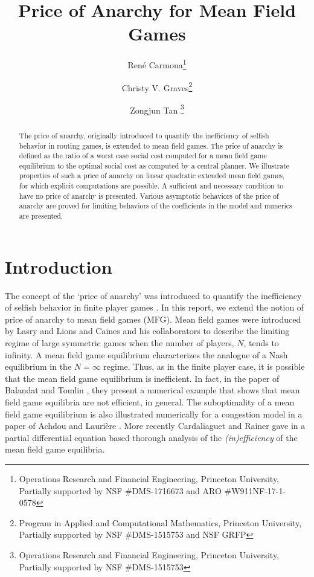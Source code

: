 \documentclass[11pt]{article}
\title{Price of Anarchy for Mean Field Games}
\author{
Ren\'{e} Carmona\thanks{Operations Research and Financial Engineering, Princeton University, Partially supported by NSF \#DMS-1716673 and ARO \#W911NF-17-1-0578} 
\and 
Christy V. Graves\thanks{Program in Applied and Computational Mathematics, Princeton University, Partially supported by NSF \#DMS-1515753 and NSF GRFP}
\and
Zongjun Tan \thanks{Operations Research and Financial Engineering, Princeton University, Partially supported by NSF \#DMS-1515753} 
}
\begin{document}
\maketitle

\begin{abstract}
    The price of anarchy, originally introduced to quantify the inefficiency of selfish behavior in routing games, is extended to mean field games. The price of anarchy is defined as the ratio of a worst case social cost computed for a mean field game equilibrium to the optimal social cost as computed by a central planner. We illustrate properties of such a price of anarchy on linear quadratic extended mean field games, for which explicit computations are possible. A sufficient and necessary condition to have no price of anarchy is presented. Various asymptotic behaviors of the price of anarchy are proved for limiting behaviors of the coefficients in the model and numerics are presented.
\end{abstract}


\section{\textbf{Introduction}} \label{se:introduction}
The concept of the `price of anarchy' was introduced to quantify the inefficiency of selfish behavior in finite player games \cite{christodoulou2005price2}\cite{christodoulou2005price}\cite{koutsoupias1999worst}\cite{Roughgarden}\cite{roughgarden2002bad}\cite{zhu2010price}. In this report, we extend the notion of price of anarchy to mean field games (MFG). Mean field games were introduced by Lasry and Lions \cite{Lasry_Lions} and Caines and his collaborators \cite{Huang} to describe the limiting regime of large symmetric games when the number of players, $N$, tends to infinity. A mean field game equilibrium characterizes the analogue of a Nash equilibrium in the $N=\infty$ regime. Thus, as in the finite player case, it is possible that the mean field game equilibrium is inefficient. In fact, in the paper of Balandat and Tomlin \cite{balandat2013efficiency}, they present a numerical example that shows that mean field game equilibria are not efficient, in general. The suboptimality of a mean field game equilibrium is also illustrated numerically for a congestion model in a paper of Achdou and Lauri\`{e}re \cite{achdou2015system}. More recently Cardaliaguet and Rainer gave in \cite{pierre_poa} a partial differential equation based thorough analysis of the \emph{(in)efficiency} of the mean field game equilibria.
\end{document}
